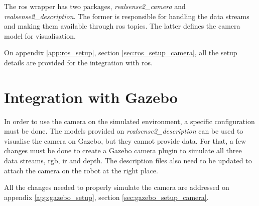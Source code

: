 The \gls{ros} wrapper has two packages, \textit{realsense2\_camera} and \textit{realsense2\_description}. The former is responsible for handling the data streams and making them available through \gls{ros} topics. The latter defines the camera model for visualisation.

On appendix \ref{app:ros_setup}, section \ref{sec:ros_setup_camera}, all the setup details are provided for the integration with \gls{ros}.



\section{Integration with Gazebo}
\label{sec:vision_system_integration_gazebo}

In order to use the camera on the simulated environment, a specific configuration must be done. The models provided on \textit{realsense2\_description} can be used to visualise the camera on Gazebo, but they cannot provide data. For that, a few changes must be done to create a Gazebo camera plugin to simulate all three data streams, \gls{rgb}, \gls{ir} and depth. The description files also need to be updated to attach the camera on the robot at the right place.

All the changes needed to properly simulate the camera are addressed on appendix \ref{app:gazebo_setup}, section \ref{sec:gazebo_setup_camera}.


